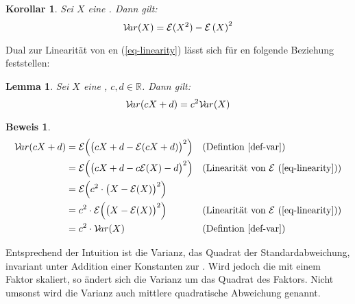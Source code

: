 \documentclass[a4paper]{article}
\newtheorem{korollar}[satz]{Korollar}
\newtheorem{lemma}[satz]{Lemma}
\theoremstyle{nonumberplain}
\newtheorem{beweis}{Beweis}
\begin{document}
\begin{korollar}\label{kor-var-exp}
	Sei $X$ eine \rvar{}. Dann gilt:
	\begin{equation}
		\mathcal{V}\!ar(X) = \mathcal{E}(X^{2}) - \mathcal{E}\left(X\right)^{2}
	\end{equation}
\end{korollar}
Dual zur Linearität von \expect{}en (\ref{eq-linearity}) lässt sich für \var{}en folgende Beziehung feststellen:
\begin{lemma}\label{lemma-var-qlinear}
	Sei $X$ eine \rvar{}, $c,d \in \mathbb{R}$. Dann gilt:
	\begin{equation}
		\mathcal{V}\!ar(cX + d) = c^2\mathcal{V}\!ar(X)
	\end{equation}
\end{lemma}
\begin{beweis}
\begin{align*}
\mathcal{V}\!ar(cX + d) & = \mathcal{E}\Big(\big(cX + d - \mathcal{E}(cX + d)\big)^2\Big) && \text{(Defintion \ref{def-var})} \\
& = \mathcal{E}\Big(\big(cX + d - c\mathcal{E}(X) - d\big)^2\Big) && \text{(Linearität von $\mathcal{E}$ (\ref{eq-linearity}))}\\
& = \mathcal{E}\Big(c^2 \cdot \big(X - \mathcal{E}(X) \big)^2\Big)\\
& = c^2 \cdot \mathcal{E}\Big( \big(X - \mathcal{E}(X) \big)^2\Big) && \text{(Linearität von $\mathcal{E}$ (\ref{eq-linearity}))}\\
& = c^2 \cdot \mathcal{V}\!ar(X) && \text{(Defintion \ref{def-var})}
\end{align*}
\end{beweis}
Entsprechend der Intuition ist die Varianz, das Quadrat der Standardabweichung, invariant unter Addition einer Konstanten zur \rvar{}. Wird jedoch die \rvar{} mit einem Faktor skaliert, so ändert sich die Varianz um das Quadrat des Faktors. Nicht umsonst wird die Varianz auch mittlere quadratische Abweichung genannt.
\end{document}
